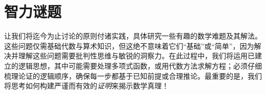 \section{智力谜题}\label{sec:section1.4}

让我们将迄今为止讨论的原则付诸实践，具体研究一些有趣的数学难题及其解法。这些问题仅需基础代数与算术知识，但这绝不意味着它们``基础''或``简单''，因为解决并理解这些问题需要批判性思维与敏锐的洞察力。在此过程中，我们将运用已建立的逻辑思想，其中可能需要处理多项式函数，或用代数方法求解方程；必须仔细梳理论证的逻辑顺序，确保每一步都基于已知前提或合理推论。最重要的是，我们将思考如何构建严谨而有效的\emph{证明}来揭示数学真理！









